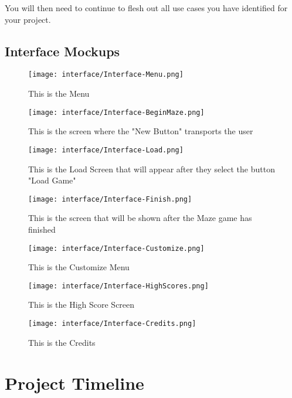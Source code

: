 \documentclass[10pt,conference,onecolumn,compsoc]{IEEEtran}
\begin{document}
You will then need to continue to flesh out all use cases you have identified for your project.

\subsection{Interface Mockups}

\begin{figure}[ht!]
\texttt{[image: interface/Interface-Menu.png]}
\caption{This is the Menu}
\label{Menu}
\end{figure}
\begin{figure}[ht!]
\texttt{[image: interface/Interface-BeginMaze.png]}
\caption{This is the screen where the "New Button" transports the user}
\label{Start of Maze}
\end{figure}
\begin{figure}[ht!]
\texttt{[image: interface/Interface-Load.png]}
\caption{This is the Load Screen that will appear after they select the button "Load Game"}
\label{Load Screen}
\end{figure}
\begin{figure}[ht!]
\texttt{[image: interface/Interface-Finish.png]}
\caption{This is the screen that will be shown after the Maze game has finished}
\label{Finish Screen}
\end{figure}
\begin{figure}[ht!]
\texttt{[image: interface/Interface-Customize.png]}
\caption{This is the Customize Menu}
\label{Customize Menu}
\end{figure}
\begin{figure}[ht!]
\texttt{[image: interface/Interface-HighScores.png]}
\caption{This is the High Score Screen}
\label{High Scores}
\end{figure}
\begin{figure}[ht!]
\texttt{[image: interface/Interface-Credits.png]}
\caption{This is the Credits}
\label{Credits}
\end{figure}
\clearpage
\section{Project Timeline}
\end{document}
